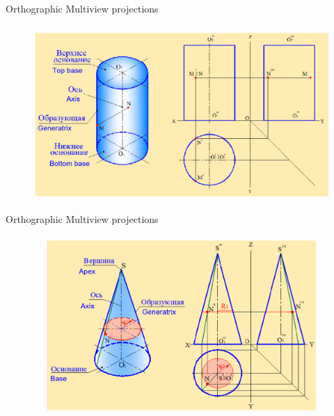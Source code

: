 \documentclass[aspectratio=169]{beamer}
\begin{document}
\begin{frame}[t]{Orthographic Multiview projections}
    \framesubtitle{}
    \vspace{-0.6cm}
    \begin{figure}[H]
        \centering\includegraphics[height=6.5cm,width=1\textwidth,keepaspectratio]{resources/multiview_1.png}
        \label{fig:resources/multiview_1.png}
    \end{figure}
\end{frame}

\begin{frame}[t]{Orthographic Multiview projections}
    \framesubtitle{}
    \vspace{-0.6cm}
    \begin{figure}[H]
        \centering\includegraphics[height=6.5cm,width=1\textwidth,keepaspectratio]{resources/multiview_2.png}
        \label{fig:resources/multiview_2.png}
    \end{figure}
\end{frame}
\end{document}

